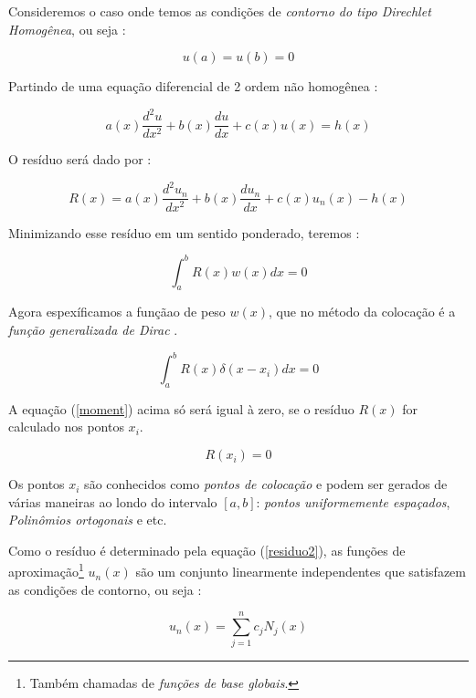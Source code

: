\documentclass[a4paper, 12pt]{article}
\numberwithin{equation}{section}
\begin{document}
Consideremos o caso onde temos as condições de \textit{contorno do tipo Direchlet Homogênea}, ou seja : 

\begin{equation}
    u(a) = u(b) = 0 
\end{equation}

Partindo de uma equação diferencial de 2 ordem não homogênea : 

\begin{equation}
     a(x) \dfrac{d^2u}{dx^2} + b(x)\dfrac{du}{dx} + c(x)u(x)  = h(x)
\end{equation}

O resíduo será dado por : 

\begin{equation}
    R(x) = a(x) \dfrac{d^2u_n}{dx^2} + b(x)\dfrac{du_n}{dx} + c(x)u_n(x)  - h(x) \label{residuo2}
\end{equation}

Minimizando esse resíduo em um sentido ponderado, teremos : 

\begin{equation}
    \int_{a}^{b} R(x) w(x) dx = 0
\end{equation}

Agora espexíficamos a funçãao de peso $w(x)$, que no método da colocação é a \textit{função generalizada de Dirac} \citep{bassalo2011elementos}. 

\begin{equation}
     \int_{a}^{b} R(x) \delta(x - x_i) dx = 0 \label{moment}
\end{equation}

A equação (\ref{moment}) acima só será igual à zero, se o resíduo $R(x)$ for calculado nos pontos $x_i$.

\begin{equation}
    R(x_i) = 0  \label{resi}
\end{equation}

Os pontos $x_i$ são conhecidos como \textit{pontos de colocação} e podem ser gerados de várias maneiras  ao londo do intervalo $[a,b]$: \textit{pontos uniformemente espaçados}, \textit{Polinômios ortogonais} e etc. 

Como o resíduo é determinado pela equação (\ref{residuo2}), as funções de aproximação\footnote{Também chamadas de \textit{funções de base globais}.} $u_n(x)$ são um conjunto linearmente independentes que satisfazem as condições de contorno, ou seja : 

\begin{equation}
    u_n(x) = \sum_{j = 1}^{n} c_j N_j(x)  \label{funcs_base_momet}
\end{equation}
\end{document}
